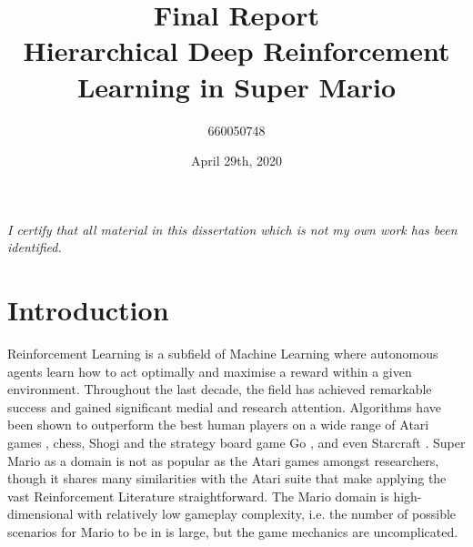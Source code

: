 \documentclass[notitlepage,a4paper,11pt]{article}
\begin{document}
\title{\textbf{Final Report\\
	\large{Hierarchical Deep Reinforcement Learning in Super Mario}}}

\author{660050748}
\date{April 29th, 2020}
\maketitle

\begin{abstract}
 
\end{abstract}


\vspace*{\fill}
\textit{I certify that all material in this dissertation which is not my own work has been identified.}

\fancyhf{}
\fancyhead[LE]{\leftmark}
\fancyhead[RO]{\rightmark}

\fancyfoot[LE,RO]{\thepage}
\pagebreak


\pagebreak
{}
\section{Introduction}
Reinforcement Learning is a subfield of Machine Learning where autonomous agents learn how to act optimally and maximise a reward within a given environment. Throughout the last decade, the field has achieved remarkable success and gained significant medial and research attention. Algorithms have been shown to outperform the best human players on a wide range of Atari games \cite{DBLP:journals/corr/MnihKSGAWR13}, chess, Shogi and the strategy board game Go \cite{alpha_go}, and even Starcraft \cite{arulkumaran2019alphastar}. Super Mario as a domain is not as popular as the Atari games amongst researchers, though it shares many similarities with the Atari suite that make applying the vast Reinforcement Literature straightforward. The Mario domain is high-dimensional with relatively low gameplay complexity, i.e. the number of possible scenarios for Mario to be in is large, but the game mechanics are uncomplicated.
\end{document}
